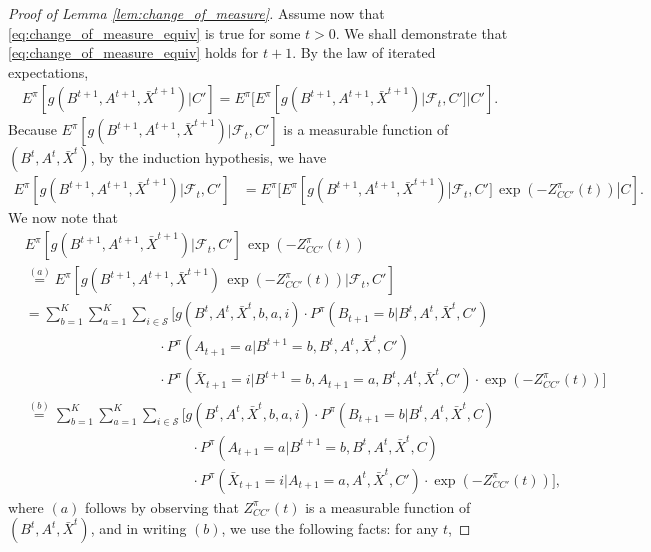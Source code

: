 \begin{proof}[Proof of Lemma \ref{lem:change_of_measure}]
	Assume now that \eqref{eq:change_of_measure_equiv} is true for some $t>0$. We shall demonstrate that \eqref{eq:change_of_measure_equiv} holds for $t+1$. By the law of iterated expectations,
	\begingroup \allowdisplaybreaks\begin{align}
		E^\pi[g(B^{t+1},A^{t+1},\bar{X}^{t+1})|C']=E^\pi[E^\pi[g(B^{t+1},A^{t+1},\bar{X}^{t+1})|\mathcal{F}_t,C']|C'].\label{eq:change_of_measure_4}
	\end{align}\endgroup
	Because $E^\pi[g(B^{t+1},A^{t+1},\bar{X}^{t+1})|\mathcal{F}_t,C']$ is a measurable function of $(B^t,A^t,\bar{X}^t)$, by the induction hypothesis, we have
	\begingroup \allowdisplaybreaks\begin{align}
		E^\pi[g(B^{t+1},A^{t+1},\bar{X}^{t+1})|\mathcal{F}_t,C']&=E^\pi[E^\pi[g(B^{t+1},A^{t+1},\bar{X}^{t+1})|\mathcal{F}_t,C']\,\exp(-Z^\pi_{CC'}(t))|C].\label{eq:change_of_measure_5}
	\end{align}\endgroup
	We now note that
	\begingroup \allowdisplaybreaks\begin{align}
		& E^\pi[g(B^{t+1},A^{t+1},\bar{X}^{t+1})|\mathcal{F}_t,C']\,\exp(-Z^\pi_{CC'}(t))\nonumber\\
		&\stackrel{(a)}{=}E^\pi[g(B^{t+1},A^{t+1},\bar{X}^{t+1})\,\exp(-Z^\pi_{CC'}(t))|\mathcal{F}_t,C']\,\nonumber\\
		&=\sum\limits_{b=1}^{K}\sum\limits_{a=1}^{K}\sum\limits_{i\in\mathcal{S}}\bigg[g(B^t,A^t,\bar{X}^t,b, a, i)\cdot P^\pi(B_{t+1}=b|B^t,A^t,\bar{X}^t,C')\nonumber\\
		&\hspace{4cm}\cdot P^\pi(A_{t+1}=a|B^{t+1}=b,B^t,A^t,\bar{X}^t,C')\nonumber\\
		&\hspace{4cm} \cdot P^\pi(\bar{X}_{t+1}=i|B^{t+1}=b,A_{t+1}=a,B^t,A^t,\bar{X}^t,C')\cdot \exp(-Z^\pi_{CC'}(t))\bigg]\nonumber\\
		&\stackrel{(b)}{=}\sum\limits_{b=1}^{K}\sum\limits_{a=1}^{K}\sum\limits_{i\in\mathcal{S}}\bigg[g(B^t,A^t,\bar{X}^t,b, a, i)\cdot P^\pi(B_{t+1}=b|B^t,A^t,\bar{X}^t,C)\nonumber\\
		&\hspace{5cm}\cdot P^\pi(A_{t+1}=a|B^{t+1}=b,B^t,A^t,\bar{X}^t,C)\nonumber\\
		&\hspace{5cm} \cdot P^\pi(\bar{X}_{t+1}=i|A_{t+1}=a,A^t,\bar{X}^t,C')\cdot \exp(-Z^\pi_{CC'}(t))\bigg],\label{eq:change_of_measure_6}
	\end{align}\endgroup
	where $(a)$ follows by observing that $Z^\pi_{CC'}(t)$ is a measurable function of $(B^t, A^t,\bar{X}^t)$, and in writing $(b)$, we use the following facts: for any $t$,

\end{proof}

